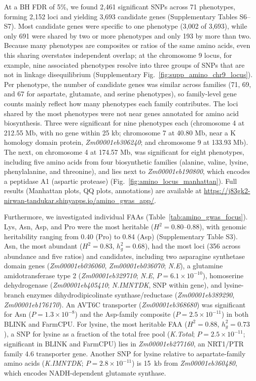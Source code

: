 At a BH FDR of 5\%, we found 2,461 significant SNPs across 71 phenotypes, forming 2,152 loci and yielding 3,693 candidate genes (Supplementary Tables S6--S7). Most candidate genes were specific to one phenotype (3,002 of 3,693), while only 691 were shared by two or more phenotypes and only 193 by more than two. Because many phenotypes are composites or ratios of the same amino acids, even this sharing overstates independent overlap; at the chromosome 9 locus, for example, nine associated phenotypes resolve into three groups of SNPs that are not in linkage disequilibrium (Supplementary Fig.~\ref{fig:supp_amino_chr9_locus}). Per phenotype, the number of candidate genes was similar across families (71, 69, and 67 for aspartate, glutamate, and serine phenotypes), so family-level gene counts mainly reflect how many phenotypes each family contributes. The loci shared by the most phenotypes were not near genes annotated for amino acid biosynthesis. Three were significant for nine phenotypes each (chromosome 4 at 212.55 Mb, with no gene within 25 kb; chromosome 7 at 40.80 Mb, near a K homology domain protein, \textit{Zm00001eb306240}; and chromosome 9 at 133.93 Mb). The next, on chromosome 4 at 174.57 Mb, was significant for eight phenotypes, including five amino acids from four biosynthetic families (alanine, valine, lysine, phenylalanine, and threonine), and lies next to \textit{Zm00001eb190800}, which encodes a peptidase A1 (aspartic protease) (Fig.~\ref{fig:amino_locus_manhattan}). Full results (Manhattan plots, QQ plots, annotations) are available at \url{https://j83gk2-nirwan-tandukar.shinyapps.io/amino_gwas_app/}.

Furthermore, we investigated individual FAAs (Table~\ref{tab:amino_gwas_focus}). Lys, Asn, Asp, and Pro were the most heritable ($H^2=0.80$--$0.88$), with genomic heritability ranging from 0.40 (Pro) to 0.84 (Asp) (Supplementary Table S3). Asn, the most abundant ($H^2=0.83$, $h^2_g=0.68$), had the most loci (356 across abundance and five ratios) and candidates, including two asparagine synthetase domain genes (\textit{Zm00001eb036060}, \textit{Zm00001eb036070}; \textit{N.E}), a glutamine amidotransferase type 2 (\textit{Zm00001eb329710}; \textit{N.E}, $P=6.1\times10^{-10}$), homoserine dehydrogenase (\textit{Zm00001eb405410}; \textit{N.IMNTDK}, SNP within gene), and lysine-branch enzymes dihydrodipicolinate synthase/reductase (\textit{Zm00001eb389290}, \textit{Zm00001eb176170}). An AVT6C transporter (\textit{Zm00001eb368680}) was significant for Asn ($P=1.3\times10^{-8}$) and the Asp-family composite ($P=2.5\times10^{-11}$) in both BLINK and FarmCPU. For lysine, the most heritable FAA ($H^2 = 0.88$, $h^2_g = 0.73$), a SNP for lysine as a fraction of the total free pool (\textit{K.Total}; $P = 2.5 \times 10^{-11}$; significant in BLINK and FarmCPU) lies in \textit{Zm00001eb277160}, an NRT1/PTR family 4.6 transporter gene. Another SNP for lysine relative to aspartate-family amino acids (\textit{K.IMNTDK}; $P = 2.8 \times 10^{-11}$) is 15~kb from \textit{Zm00001eb360480}, which encodes NADH-dependent glutamate synthase.

